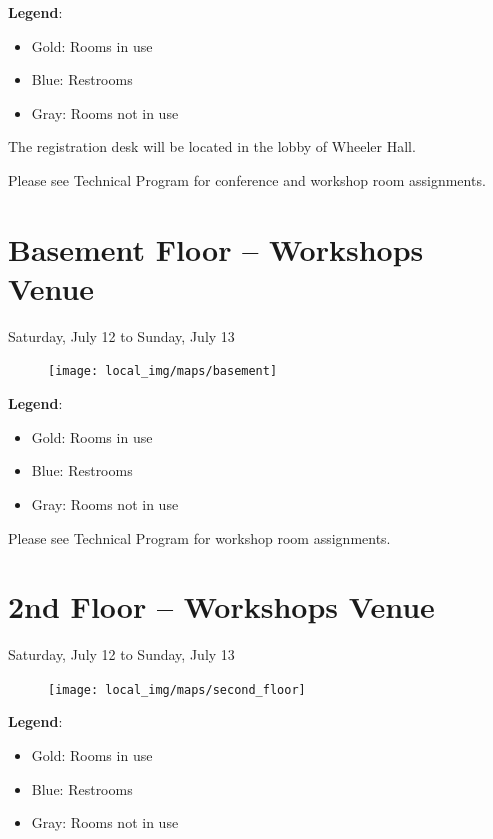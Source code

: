 {\Large \textbf{Legend}: 
\begin{itemize}
\itemsep0em 
\item Gold: Rooms in use 
\item Blue: Restrooms
\item Gray: Rooms not in use
\end{itemize}
}

\vspace{0.3cm}
{\Large The registration desk will be located in the lobby of Wheeler Hall.}

\vspace{0.3cm}
{\Large Please see Technical Program for conference and workshop room assignments.}

\newpage
{} \section{Basement Floor -- Workshops Venue}
{\large Saturday, July 12 to Sunday, July 13}

\begin{figure}[h!]
\center
\texttt{[image: local\_img/maps/basement]}
\end{figure}

\vspace{0.3cm}

{\Large \textbf{Legend}: 
\begin{itemize}
\itemsep0em 
\item Gold: Rooms in use 
\item Blue: Restrooms
\item Gray: Rooms not in use
\end{itemize}
}

\vspace{0.3cm}
{\Large Please see Technical Program for workshop room assignments.}

\newpage
{} \section{2nd Floor -- Workshops Venue}
{\large Saturday, July 12 to Sunday, July 13}

\begin{figure}[h!]
\center
\texttt{[image: local\_img/maps/second\_floor]}
\end{figure}

\vspace{0.3cm}

{\Large \textbf{Legend}: 
\begin{itemize}
\itemsep0em 
\item Gold: Rooms in use 
\item Blue: Restrooms
\item Gray: Rooms not in use
\end{itemize}
}


